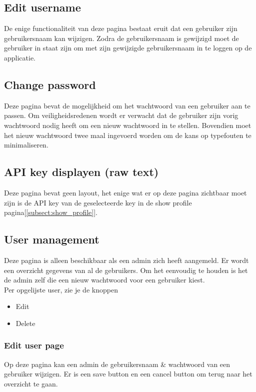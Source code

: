 \documentclass{article}
\begin{document}
\subsection{Edit username}
\label{subsect:Edit_profile}
De enige functionaliteit van deze pagina bestaat eruit dat een gebruiker zijn gebruikersnaam kan wijzigen. Zodra de gebruikersnaam is gewijzigd moet de gebruiker in staat zijn om met zijn gewijzigde gebruikersnaam in te loggen op de applicatie.

\subsection{Change password}
\label{subsect:change_password}
Deze pagina bevat de mogelijkheid om het wachtwoord van een gebruiker aan te passen. Om veiligheidsredenen wordt er verwacht dat de gebruiker zijn vorig wachtwoord nodig heeft om een nieuw wachtwoord in te stellen. Bovendien moet het nieuw wachtwoord twee maal ingevoerd worden om de kans op typefouten te minimaliseren.


\subsection{API key displayen (raw text)}
\label{subsect:raw_api}
Deze pagina bevat geen layout, het enige wat er op deze pagina zichtbaar moet zijn is de API key van de geselecteerde key in de show profile pagina[\ref{subsect:show_profile}].


\subsection{User management}
\label{subsect: user management}
Deze pagina is alleen beschikbaar als een admin zich heeft aangemeld. Er wordt een overzicht gegevens van al de gebruikers. Om het eenvoudig te houden is het de admin zelf die een nieuw wachtwoord voor een gebruiker kiest. \\

Per opgelijste user, zie je de knoppen 
\begin{itemize}
    \item Edit
    \item Delete
\end{itemize}


\subsubsection{Edit user page}
Op deze pagina kan een admin de gebruikersnaam \& wachtwoord van een gebruiker wijzigen. Er is een save button en een cancel button om terug naar het overzicht te gaan.
\end{document}
